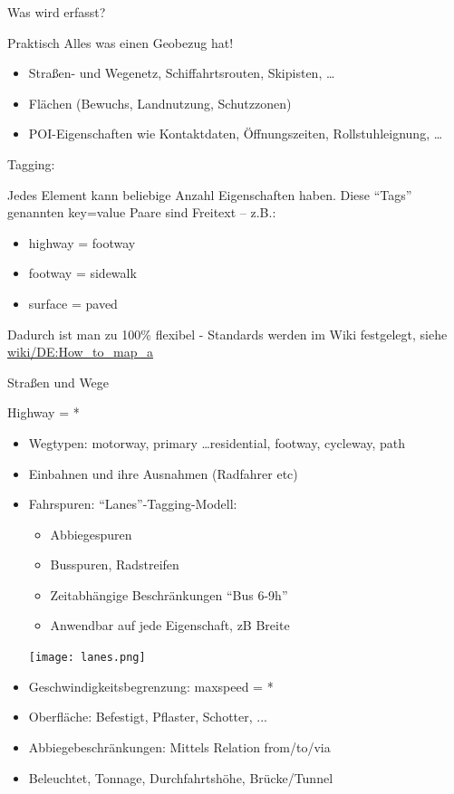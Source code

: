 \documentclass{beamer}
\begin{document}
\begin{frame}{Was wird erfasst?}

Praktisch Alles was einen Geobezug hat!

\pause

\begin{itemize}
  \item Straßen- und Wegenetz, Schiffahrtsrouten, Skipisten, \dots
  \item Flächen (Bewuchs, Landnutzung, Schutzzonen)
  \item POI-Eigenschaften wie Kontaktdaten, Öffnungszeiten, Rollstuhleignung, \dots
\end{itemize}

\pause

Tagging: 

Jedes Element kann beliebige Anzahl Eigenschaften haben.
Diese "`Tags"' genannten key=value Paare sind Freitext -- z.B.:
\begin{itemize}
  \item highway = footway 
  \item footway = sidewalk 
  \item surface = paved 
\end{itemize}

Dadurch ist man zu 100\% flexibel - Standards werden im Wiki festgelegt, siehe \href{http://wiki.openstreetmap.org/wiki/DE:How\_to\_map\_a}{wiki/DE:How\_to\_map\_a}

\end{frame}

\begin{frame}{ Straßen und Wege}

Highway = *

\begin{itemize}
  \item Wegtypen: motorway, primary \dots  residential, footway, cycleway, path
  \item Einbahnen und ihre Ausnahmen (Radfahrer etc)
\pause
  \item Fahrspuren: "`Lanes"'-Tagging-Modell:
  \begin{itemize}
    \item Abbiegespuren
    \item Busspuren, Radstreifen
    \item Zeitabhängige Beschränkungen "`Bus 6-9h"'
    \item Anwendbar auf jede Eigenschaft, zB Breite
  \end{itemize}
 \vspace*{-2.6cm}
\hfill\texttt{[image: lanes.png]}

\pause
  \item Geschwindigkeitsbegrenzung: maxspeed = *
  \item Oberfläche: Befestigt, Pflaster, Schotter, ...
  \item Abbiegebeschränkungen: Mittels Relation from/to/via
  \item Beleuchtet, Tonnage, Durchfahrtshöhe, Brücke/Tunnel
\end{itemize}

\end{frame}
\end{document}
